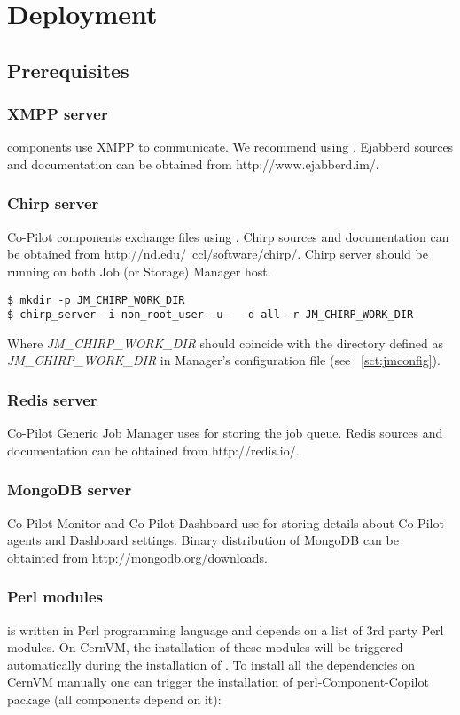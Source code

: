 \chapter{Deployment}
\section{Prerequisites}
\subsection{XMPP server}
\copilot components use XMPP to communicate. We recommend using  \cite{ejabberd}. Ejabberd sources and documentation can be obtained from
http://www.ejabberd.im/.

\subsection{Chirp server}
Co-Pilot components exchange files using \cite{chirp}. Chirp sources and documentation can be obtained from http://nd.edu/~ccl/software/chirp/. Chirp server should be running on both Job (or Storage) Manager host.

\lstset{caption=Starting Chirp server}
\begin{lstlisting}
$ mkdir -p JM_CHIRP_WORK_DIR
$ chirp_server -i non_root_user -u - -d all -r JM_CHIRP_WORK_DIR
\end{lstlisting}

Where \emph{JM\_CHIRP\_WORK\_DIR} should coincide with the directory defined as \emph{JM\_CHIRP\_WORK\_DIR} in Manager's configuration file (see ~\ref{sct:jmconfig}).

\subsection{Redis server}
Co-Pilot Generic Job Manager uses \cite{redis} for storing the job queue. Redis sources and documentation can be obtained from http://redis.io/.

\subsection{MongoDB server}
Co-Pilot Monitor and Co-Pilot Dashboard use \cite{mongodb} for storing details about Co-Pilot agents and Dashboard settings. Binary distribution of MongoDB can be obtainted from http://mongodb.org/downloads.

\subsection{Perl modules}
\copilot is written in Perl programming language and depends on a list of 3rd party Perl modules. On CernVM, the installation of these modules will be triggered automatically during the installation of \copilot. To install all the dependencies on CernVM manually one can trigger the installation of perl-Component-Copilot package (all \copilot components depend on it):

